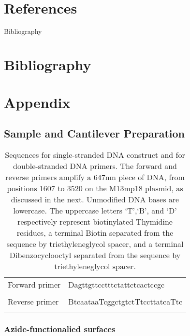 \documentclass[%
  aip,12pt,tightenlines,
  amsthm,
 amsmath,amssymb
]{article}
\newcommand{\e}[0]{\\ \hline}
\newcommand{\tLabel}[1]{\label{table:#1}}
\newcommand{\sLabel}[1]{\label{section:#1}}
\newcommand{\pcaption}[1]{\caption{\noindent#1}}
\begin{document}
\clearpage

\section{References}



\clearpage

Bibliography 

\section{Bibliography}

 


\clearpage

\section{Appendix}

\renewcommand{\thepage}{S\arabic{page}} 
\renewcommand{\thesection}{S\arabic{section}}  
\renewcommand{\thetable}{S\arabic{table}}  
\renewcommand{\thefigure}{S\arabic{figure}} 
\setcounter{figure}{0}
\setcounter{table}{0}


\subsection{\sLabel{SampleDetails}Sample and Cantilever Preparation}


\begin{table}
\begin{tabularx}{\textwidth}{ l | l  }
\hline \hline
Forward primer & Dagttgttcctttctattctcactccgc \\ \e 
Reverse primer & BtcaataaTcggctgtctTtccttatcaTtc \\ \e 
\end{tabularx}
\pcaption{\tLabel{Sequences}Sequences for single-stranded DNA construct and for double-stranded DNA primers. The forward and reverse primers amplify a 647nm piece of DNA, from positions 1607 to 3520 on the M13mp18 plasmid, as discussed in the next. Unmodified DNA bases are lowercase. The uppercase letters `T',`B', and `D' respectively represent biotinylated Thymidine residues, a terminal Biotin separated from the sequence by triethyleneglycol spacer, and a terminal Dibenzocyclooctyl separated from the sequence by triethyleneglycol spacer.}
\end{table}


\subsubsection{\sLabel{Surface}Azide-functionalied surfaces}
\end{document}
